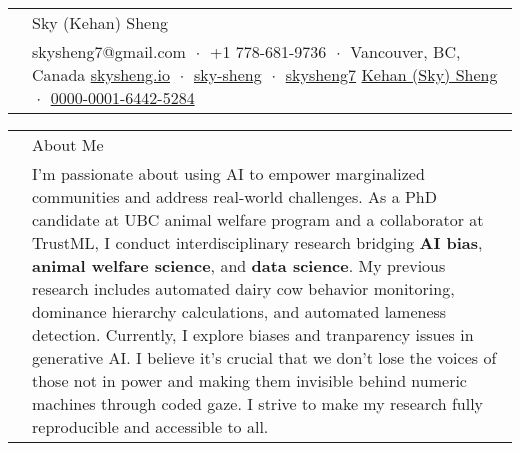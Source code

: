 \documentclass[letterpaper, 11pt]{article}
\newcommand{\socialicon}[1]{\raisebox{-0.05em}{\resizebox{!}{1em}{#1}}}
\newcommand{\headingfont}{\Large\color{OliveGreen}}
\newenvironment{SectionTable}[1]{
	\renewcommand*{\arraystretch}{1.7}
	\setlength{\tabcolsep}{10pt}
	\begin{longtable}{Rp{5.2in}} & #1 \\}
{\end{longtable}\vspace{-.3cm}}
\begin{document}

\begin{SectionTable}{\Huge Sky (Kehan) Sheng} & 
skysheng7@gmail.com  $\;\boldsymbol{\cdot}\;$ 
+1 778-681-9736 $\;\boldsymbol{\cdot}\;$ Vancouver, BC, Canada\newline
\socialicon{\faGlobe} \href{https://skysheng.io}{skysheng.io} $\;\boldsymbol{\cdot}\;$
\socialicon{\faLinkedin} \href{www.linkedin.com/in/sky-sheng}{sky-sheng} $\;\boldsymbol{\cdot}\;$
\socialicon{\faGithub} \href{https://github.com/skysheng7}{skysheng7} \newline 
\socialicon{\faGraduationCap} \href{https://scholar.google.com/citations?user=yz-cWVgAAAAJ}{Kehan (Sky) Sheng}
$\;\boldsymbol{\cdot}\;$ 
\socialicon{\faOrcid} \href{https://orcid.org/0000-0001-6442-5284}{0000-0001-6442-5284} 
\end{SectionTable}

\begin{SectionTable}{\headingfont About Me}
& I'm passionate about using AI to empower marginalized communities and address real-world challenges. As a PhD candidate at UBC animal welfare program and a collaborator at TrustML, I conduct interdisciplinary research bridging \textbf{AI bias}, \textbf{animal welfare science}, and \textbf{data science}. My previous research includes automated dairy cow behavior monitoring, dominance hierarchy calculations, and automated lameness detection. Currently, I explore biases and tranparency issues in generative AI. I believe it's crucial that we don't lose the voices of those not in power and making them invisible behind numeric machines through coded gaze. I strive to make my research fully reproducible and accessible to all.
\end{SectionTable}
\end{document}
